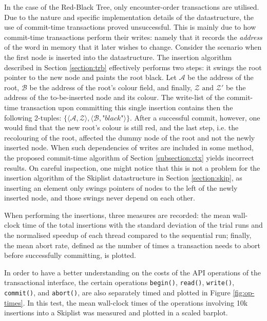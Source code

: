 In the case of the Red-Black Tree, only encounter-order transactions are utilised. Due to the nature and specific implementation details of the datastructure, the use of commit-time transactions proved unsuccessful. This is mainly due to how commit-time transactions perform their writes: namely that it records the \textit{address} of the word in memory that it later wishes to change. Consider the scenario when the first node is inserted into the datastructure. The insertion algorithm described in Section \ref{section:trb} effectively performs two steps: it swings the root pointer to the new node and paints the root black. Let $\mathcal{A}$ be the address of the root, $\mathcal{B}$ be the address of the root's colour field, and finally, $\mathcal{Z}\text{ and }\mathcal{Z}'$ be the address of the to-be-inserted node and its colour. The write-list of the commit-time transaction upon committing this single insertion contains then the following 2-tuples: $\{\langle\mathcal{A}, \mathcal{Z}\rangle , \langle\mathcal{B}, \textit{"black"}\rangle\}$. After a successful commit, however, one would find that the new root's colour is still red, and the last step, i.e. the recolouring of the root, affected the dummy node of the root and not the newly inserted node. When such dependencies of writes are included in some method, the proposed commit-time algorithm of Section \ref{subsection:ctx} yields incorrect results. On careful inspection, one might notice that this is not a problem for the insertion algorithm of the Skiplist datastructure in Section \ref{section:skip}, as inserting an element only swings pointers of nodes to the left of the newly inserted node, and those swings never depend on each other.

When performing the insertions, three measures are recorded: the mean wall-clock time of the total insertions with the standard deviation of the trial runs and the normalised speedup of each thread compared to the sequential run; finally, the mean abort rate, defined as the number of times a transaction needs to abort before successfully committing, is plotted.

In order to have a better understanding on the costs of the API operations of the transactional interface, the certain operations \texttt{begin()}, \texttt{read()}, \texttt{write()}, \texttt{commit()}, and \texttt{abort()}, are also separately timed and plotted in Figure \ref{fig:op-times}. In this test, the mean wall-clock times of the operations involving 10k insertions into a Skiplist was measured and plotted in a scaled barplot.


